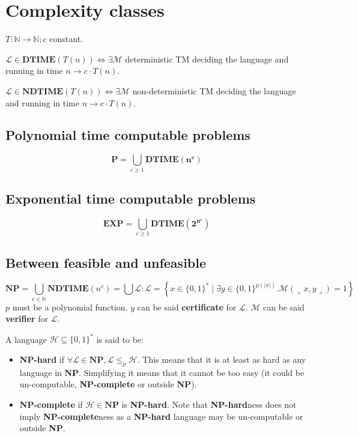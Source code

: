 \documentclass[]{article}
\begin{document}
\section{Complexity classes}

$T:\mathbb{N}\to\mathbb{N}; c $ constant. 

$\mathcal{L} \in \textbf{DTIME}(T(n)) \iff \exists \mathcal{M}$ deterministic TM deciding the language and running in time $n \rightarrow c \cdot T(n)$.

$\mathcal{L} \in \textbf{NDTIME}(T(n)) \iff \exists \mathcal{M}$ non-deterministic TM deciding the language and running in time $n \rightarrow c \cdot T(n)$.

\subsection{Polynomial time computable problems}

$$
\mathbf{P} = \bigcup\limits_{c\ge1} \mathbf{DTIME(n^c)}
$$

\subsection{Exponential time computable problems}

$$
\mathbf{EXP} = \bigcup\limits_{c\ge1} \mathbf{DTIME(2^{n^c})}
$$

\subsection{Between feasible and unfeasible}

$$
\mathbf{NP} = \bigcup\limits_{c\in\mathbb{N}} \mathbf{NDTIME}(n^c) = \bigcup\mathcal{L}: \mathcal{L}=\left\{x \in\{0,1\}^{*} \mid \exists y \in\{0,1\}^{p(|x|)} . \mathcal{M}(\llcorner x, y\lrcorner)=1\right\}
$$
$p$ must be a polynomial function. $y$ can be said \textbf{certificate} for $\mathcal{L}$. $\mathcal{M}$ can be said \textbf{verifier} for $\mathcal{L}$.

A language $\mathcal{H} \subseteq \{0,1\}^*$ is said to be:

\begin{itemize}
	\item \textbf{NP-hard} if $\forall \mathcal{L} \in \mathbf{N P},   \mathcal{L} \le_p \mathcal{H}$. This means that it is at least as hard as any language in \textbf{NP}. Simplifying it means that it cannot be too easy (it could be un-computable, \textbf{NP-complete} or outside \textbf{NP}).
	\item \textbf{NP-complete} if $\mathcal{H} \in \mathbf{N P}$ is \textbf{NP-hard}. Note that \textbf{NP-hard}ness does not imply \textbf{NP-complete}ness as a \textbf{NP-hard} language may be un-computable or outside \textbf{NP}.
\end{itemize}
\end{document}
